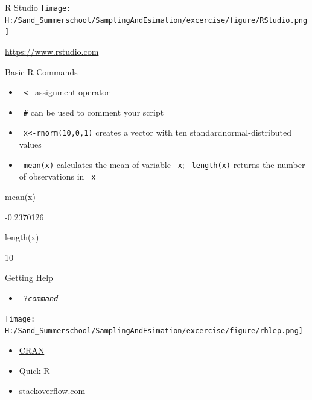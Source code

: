 \documentclass[11pt,german,hideothersubsections]{beamer}
\newcommand{\R}[1]{{\tt \color{blue}  #1}}
\begin{document}
\begin{frame}[fragile]{R Studio}
\texttt{[image: H:/Sand\_Summerschool/SamplingAndEsimation/excercise/figure/RStudio.png]}
\vspace{.5cm}
\begin{center}
\url{https://www.rstudio.com}
\end{center}
\end{frame}
\begin{frame}[fragile]{Basic R Commands}
\begin{itemize}
\item \R{<-}  assignment operator
\item \R{\#} can be used to comment your script
\item \R{x<-rnorm(10,0,1)}  creates a vector with ten standardnormal-distributed values
\item \R{mean(x)} calculates the mean of variable \R{x}; \R{length(x)} returns the number of observations in \R{x}
\end{itemize}
\begin{Schunk}
\begin{Sinput}
 mean(x)
\end{Sinput}
\begin{Soutput}
[1] -0.2370126
\end{Soutput}
\begin{Sinput}
 length(x)
\end{Sinput}
\begin{Soutput}
[1] 10
\end{Soutput}
\end{Schunk}
\end{frame}
\begin{frame}[fragile]{Getting Help}
\begin{itemize}
\item \R{?\emph{command}}
\end{itemize}
\texttt{[image: H:/Sand\_Summerschool/SamplingAndEsimation/excercise/figure/rhlep.png]}
\begin{itemize}
\item \href{https://cran.r-project.org}{CRAN}
\item \href{http://www.statmethods.net}{Quick-R}
\item \href{http://stackoverflow.com/questions/tagged/r}{stackoverflow.com}
\end{itemize}

\end{frame}
\end{document}
